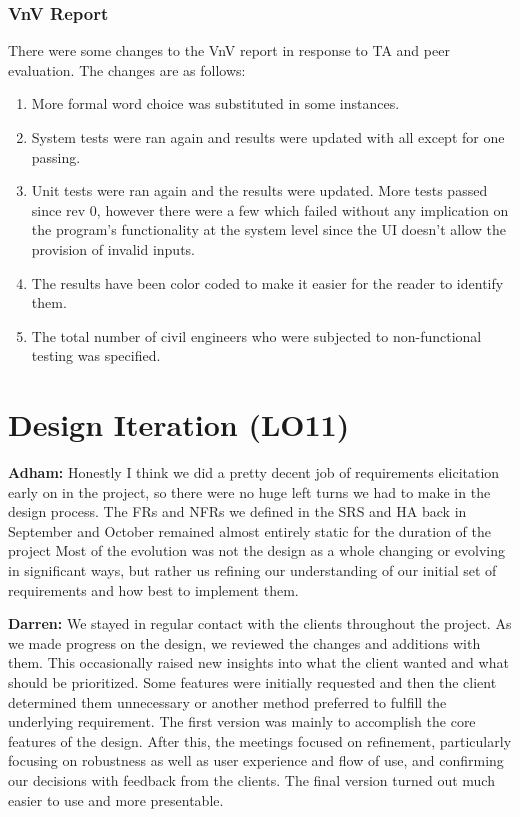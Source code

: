 \documentclass{article}
\begin{document}
\subsubsection{VnV Report}
There were some changes to the VnV report in response to TA and peer evaluation. The changes are as follows:
\begin{enumerate}
\item More formal word choice was substituted in some instances.
\item System tests were ran again and results were updated with all except for one passing.
\item Unit tests were ran again and the results were updated. More tests passed since rev 0, however there were a few which failed without any implication on the program's functionality at the system level since the UI doesn't allow the provision of invalid inputs.
\item The results have been color coded to make it easier for the reader to identify them.
\item The total number of civil engineers who were subjected to non-functional testing was specified.
\end{enumerate}
\section{Design Iteration (LO11)}


\textbf{Adham:} Honestly I think we did a pretty decent job of requirements elicitation early on in the project, so there were no huge left turns we had to make in the design
process. The FRs and NFRs we defined in the SRS and HA back in September and October remained almost entirely static for the duration of the project
Most of the evolution was not the design as a whole changing or evolving in significant ways, but rather us refining our understanding of our initial set of requirements
and how best to implement them.

\textbf{Darren:} We stayed in regular  contact with the clients throughout the project. As we made progress on the design, we reviewed the changes and additions with them.
 This occasionally raised new insights into what the client wanted and what should be prioritized. Some features were initially requested and then the client determined them 
 unnecessary or another method preferred to fulfill the underlying requirement. The first version was mainly to accomplish the core features of the design. After this, the 
 meetings focused on refinement, particularly focusing on robustness as well as user experience and flow of use, and confirming our decisions with feedback from the clients. 
 The final version turned out much easier to use and more presentable.
\end{document}
